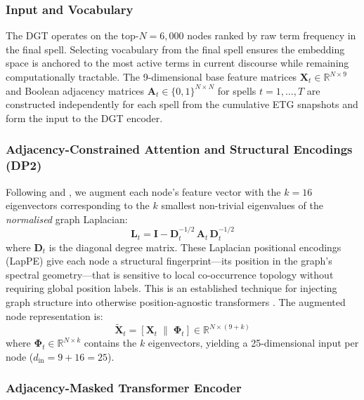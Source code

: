\documentclass[12pt]{article}
\begin{document}
\subsubsection{Input and Vocabulary}

The DGT operates on the top-$N = 6{,}000$ nodes ranked by raw term frequency in the final spell. Selecting vocabulary from the final spell ensures the embedding space is anchored to the most active terms in current discourse while remaining computationally tractable. The 9-dimensional base feature matrices $\mathbf{X}_t \in \mathbb{R}^{N \times 9}$ and Boolean adjacency matrices $\mathbf{A}_t \in \{0,1\}^{N \times N}$ for spells $t = 1, \ldots, T$ are constructed independently for each spell from the cumulative ETG snapshots and form the input to the DGT encoder.

\subsubsection{Adjacency-Constrained Attention and Structural Encodings (DP2)}

Following \textcite{kreuzer2021} and \textcite{rampasek2022}, we augment each node's feature vector with the $k = 16$ eigenvectors corresponding to the $k$ smallest non-trivial eigenvalues of the \textit{normalised} graph Laplacian:
\begin{equation}
  \mathbf{L}_t = \mathbf{I} - \mathbf{D}_t^{-1/2}\, \mathbf{A}_t\, \mathbf{D}_t^{-1/2}
\end{equation}
where $\mathbf{D}_t$ is the diagonal degree matrix. These Laplacian positional encodings (LapPE) give each node a structural fingerprint---its position in the graph's spectral geometry---that is sensitive to local co-occurrence topology without requiring global position labels. This is an established technique for injecting graph structure into otherwise position-agnostic transformers \parencite{kreuzer2021}. The augmented node representation is:
\begin{equation}
  \tilde{\mathbf{X}}_t = [\mathbf{X}_t \;\|\; \mathbf{\Phi}_t] \in \mathbb{R}^{N \times (9+k)}
\end{equation}
where $\mathbf{\Phi}_t \in \mathbb{R}^{N \times k}$ contains the $k$ eigenvectors, yielding a 25-dimensional input per node ($d_{\text{in}} = 9 + 16 = 25$).

\subsubsection{Adjacency-Masked Transformer Encoder}
\end{document}
